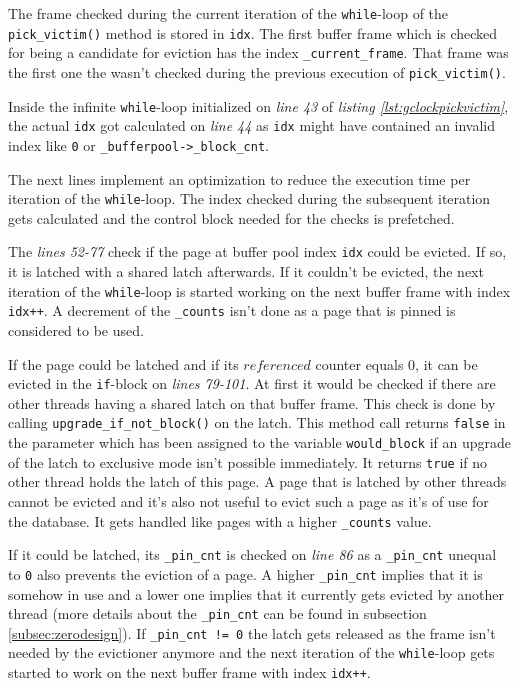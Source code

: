 	The frame checked during the current iteration of the \lstinline{while}-loop of the \lstinline{pick_victim()} method is stored in \lstinline{idx}. The first buffer frame which is checked for being a candidate for eviction has the index \lstinline{_current_frame}. That frame was the first one the wasn't checked during the previous execution of \lstinline{pick_victim()}.
	
	Inside the infinite \lstinline{while}-loop initialized on \emph{line 43} of \emph{listing \ref{lst:gclockpickvictim}}, the actual \lstinline{idx} got calculated on \emph{line 44} as \lstinline{idx} might have contained an invalid index like \lstinline{0} or \lstinline{_bufferpool->_block_cnt}.
	
	The next lines implement an optimization to reduce the execution time per iteration of the \lstinline{while}-loop. The index checked during the subsequent iteration gets calculated and the control block needed for the checks is prefetched.
	
	The \emph{lines 52-77} check if the page at buffer pool index \lstinline{idx} could be evicted. If so, it is latched with a shared latch afterwards. If it couldn't be evicted, the next iteration of the \lstinline{while}-loop is started working on the next buffer frame with index \lstinline{idx++}. A decrement of the \lstinline{_counts} isn't done as a page that is pinned is considered to be used.
	
	If the page could be latched and if its $referenced$ counter equals $0$, it can be evicted in the \lstinline{if}-block on \emph{lines 79-101}. At first it would be checked if there are other threads having a shared latch on that buffer frame. This check is done by calling \lstinline{upgrade_if_not_block()} on the latch. This method call returns \lstinline{false} in the parameter which has been assigned to the variable \lstinline{would_block} if an upgrade of the latch to exclusive mode isn't possible immediately. It returns \lstinline{true} if no other thread holds the latch of this page. A page that is latched by other threads cannot be evicted and it's also not useful to evict such a page as it's of use for the database. It gets handled like pages with a higher \lstinline{_counts} value.
	
	If it could be latched, its \lstinline{_pin_cnt} is checked on \emph{line 86} as a \lstinline{_pin_cnt} unequal to \lstinline{0} also prevents the eviction of a page. A higher \lstinline{_pin_cnt} implies that it is somehow in use and a lower one implies that it currently gets evicted by another thread (more details about the \lstinline{_pin_cnt} can be found in subsection \ref{subsec:zerodesign}). If \lstinline{_pin_cnt != 0} the latch gets released as the frame isn't needed by the evictioner anymore and the next iteration of the \lstinline{while}-loop gets started to work on the next buffer frame with index \lstinline{idx++}.
	
